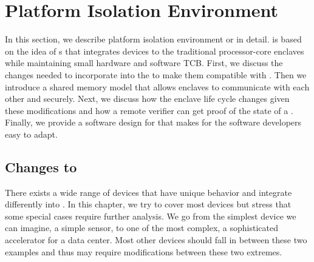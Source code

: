\section{Platform Isolation Environment}
\label{sec:approach}

In this section, we describe platform isolation environment or \name in detail. \name is based on the idea of \nameenclave{}s that integrates \sphw devices to the traditional processor-core enclaves while maintaining small hardware and software TCB. First, we discuss the changes needed to incorporate into the \sphw to make them compatible with \name. Then we introduce a shared memory model that allows enclaves to communicate with each other and \sphw securely. Next, we discuss how the enclave life cycle changes given these modifications and how a remote verifier can get proof of the state of a \nameenclave{}. Finally, we provide a software design for \name that makes \name for the software developers easy to adapt.



\subsection{Changes to \sphw} There exists a wide range of \sphw{} devices that have unique behavior and integrate differently into \name{}.  In this chapter, we try to cover most devices but stress that some special cases require further analysis. We go from the simplest \sphw device we can imagine, a simple sensor, to one of the most complex, a sophisticated accelerator for a data center. Most other \sphw devices should fall in between these two examples and thus may require modifications between these two extremes. 

